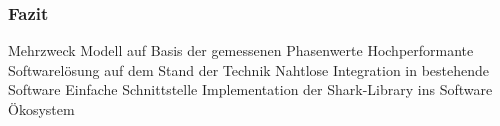 \begin{frame}
  \frametitle{Fazit}
    \pause
    Mehrzweck Modell auf Basis der gemessenen Phasenwerte
    Hochperformante Softwarelösung auf dem Stand der Technik
    Nahtlose Integration in bestehende Software
    Einfache Schnittstelle
    Implementation der Shark-Library ins Software Ökosystem
\end{frame}
